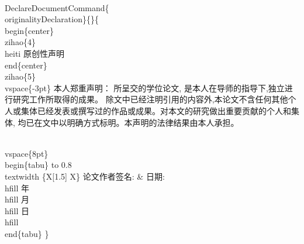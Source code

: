 \documentclass{hnuthesis}%
\begin{document}
\begin{nowebtrunk}
\nwenddocs{}\endmoddef\nwstartdeflinemarkup{}\nwenddeflinemarkup
\\DeclareDocumentCommand\{\\originalityDeclaration\}\{\}\{
    \\begin\{center\}\\zihao\{4\}\\heiti 原创性声明\\end\{center\}
        \\zihao\{5\}\\vspace\{-3pt\}
本人郑重声明： 所呈交的学位论文, 是本人在导师的指导下,独立进行研究工作所取得的成果。 除文中已经注明引用的内容外,本论文不含任何其他个人或集体已经发表或撰写过的作品或成果。对本文的研究做出重要贡献的个人和集体, 均已在文中以明确方式标明。本声明的法律结果由本人承担。

    \\vspace\{8pt\}
\\begin\{tabu\} to 0.8\\textwidth \{X[1.5] X\}
论文作者签名: & 日期:\\hfill 年\\hfill 月\\hfill 日\\hfill
\\end\{tabu\}
\}
\nwendcode{}\end{nowebtrunk}
\end{document}
